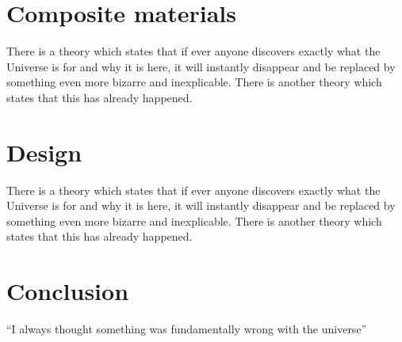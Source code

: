 \documentclass{article}
\begin{document}
\section{Composite materials }
There is a theory which states that if ever anyone discovers exactly what the Universe is for and why it is here, it will instantly disappear and be replaced by something even more bizarre and inexplicable.
There is another theory which states that this has already happened. 

\section{Design}
There is a theory which states that if ever anyone discovers exactly what the Universe is for and why it is here, it will instantly disappear and be replaced by something even more bizarre and inexplicable.
There is another theory which states that this has already happened.

\section{Conclusion}
``I always thought something was fundamentally wrong with the universe'' 
\citep{Grodzki}


\end{document}
